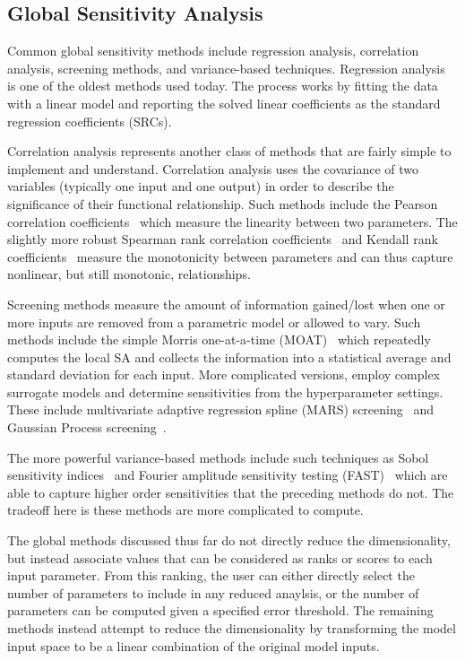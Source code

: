\subsection{Global Sensitivity Analysis}

Common global sensitivity methods include regression analysis, correlation analysis, screening methods, and variance-based techniques.
%
Regression analysis~\cite{Galton1886} is one of the oldest methods used today.
%
The process works by fitting the data with a linear model and reporting the solved linear coefficients as the standard regression coefficients (SRCs).

Correlation analysis represents another class of methods that are fairly simple to implement and understand.
%
Correlation analysis uses the covariance of two variables (typically one input and one output) in order to describe the significance of their functional relationship.
%
Such methods include the Pearson correlation coefficients~\cite{Pearson1895} which measure the linearity between two parameters.
%
The slightly more robust Spearman rank correlation coefficients~\cite{Spearman1904} and Kendall rank coefficients~\cite{KendallGibbons1990} measure the monotonicity between parameters and can thus capture nonlinear, but still monotonic, relationships.

Screening methods measure the amount of information gained/lost when one or more inputs are removed from a parametric model or allowed to vary.
%
Such methods include the simple Morris one-at-a-time (MOAT)~\cite{Morris1991} which repeatedly computes the local SA and collects the information into a statistical average and standard deviation for each input.
%
More complicated versions, employ complex surrogate models and determine sensitivities from the hyperparameter settings.
%
These include multivariate adaptive regression spline (MARS) screening~\cite{Friedman1991} and Gaussian Process screening~\cite{RasmussenWilliams2006}.

The more powerful variance-based methods include such techniques as Sobol sensitivity indices~\cite{Sobol1993} and Fourier amplitude sensitivity testing (FAST)~\cite{CukierFortuinShuler1973} which are able to capture higher order sensitivities that the preceding methods do not.
%
The tradeoff here is these methods are more complicated to compute.

The global methods discussed thus far do not directly reduce the dimensionality, but instead associate values that can be considered as ranks or scores to each input parameter.
%
From this ranking, the user can either directly select the number of parameters to include in any reduced anaylsis, or the number of parameters can be computed given a specified error threshold.
%
The remaining methods instead attempt to reduce the dimensionality by transforming the model input space to be a linear combination of the original model inputs.
%


